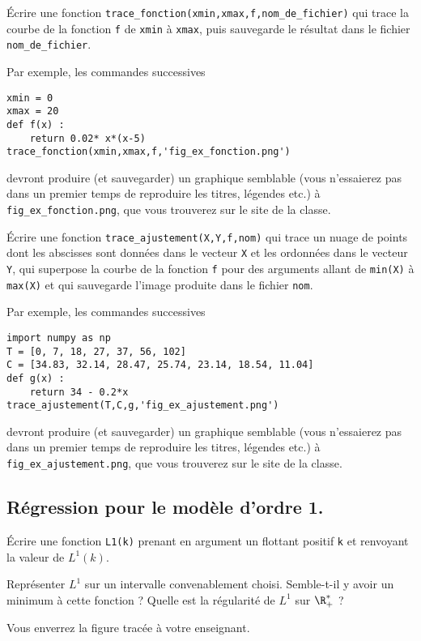 \question{} \'Ecrire une fonction \texttt{trace\_fonction(xmin,xmax,f,nom\_de\_fichier)} qui trace la courbe de la fonction \texttt{f} de \texttt{xmin} à \texttt{xmax}, puis sauvegarde le résultat dans le fichier \texttt{nom\_de\_fichier}.
  
    Par exemple, les commandes successives
\begin{verbatim}
xmin = 0
xmax = 20
def f(x) : 
    return 0.02* x*(x-5)
trace_fonction(xmin,xmax,f,'fig_ex_fonction.png')
\end{verbatim}
 devront produire (et sauvegarder) un graphique semblable (vous n'essaierez pas dans un premier temps de reproduire les titres, légendes etc.) à \texttt{fig\_ex\_fonction.png}, que vous trouverez sur le site de la classe.
    
\question{} \'Ecrire une fonction \texttt{trace\_ajustement(X,Y,f,nom)} qui trace un nuage de points 
dont les abscisses sont données dans le vecteur \texttt{X} et les ordonnées dans le vecteur 
\texttt{Y}, qui superpose la courbe de la fonction \texttt{f} pour des arguments allant de 
\texttt{min(X)} à \texttt{max(X)} et qui sauvegarde l'image produite dans le fichier \texttt{nom}.
    
    Par exemple, les commandes successives 
\begin{verbatim}
import numpy as np
T = [0, 7, 18, 27, 37, 56, 102]
C = [34.83, 32.14, 28.47, 25.74, 23.14, 18.54, 11.04]
def g(x) : 
    return 34 - 0.2*x
trace_ajustement(T,C,g,'fig_ex_ajustement.png')
\end{verbatim}
    devront produire (et sauvegarder) un graphique semblable (vous n'essaierez pas dans un premier temps de reproduire les titres, légendes etc.) à \texttt{fig\_ex\_ajustement.png}, que vous trouverez sur le site de la classe.


\subsection{Régression pour le modèle d'ordre 1.}
\label{sec.reg.o1}


\question{} Écrire une fonction \texttt{L1(k)} prenant en argument un flottant positif \texttt{k} et renvoyant la valeur de $L^1(k)$.

\medskip{}

\question{\label{qu:traceL1}} Représenter $L^1$ sur un intervalle convenablement choisi. Semble-t-il y avoir un minimum à cette fonction ? Quelle est la régularité de $L^1$ sur $\R^\ast_+$ ? 

  Vous enverrez la figure tracée à votre enseignant. 

